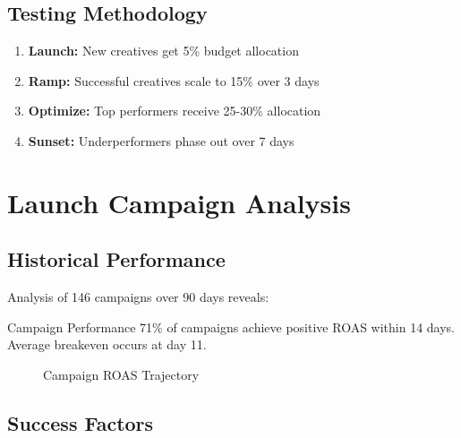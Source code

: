 \documentclass[11pt,a4paper]{report}
\begin{document}
\section{Testing Methodology}

\begin{enumerate}
\item \textbf{Launch:} New creatives get 5\% budget allocation
\item \textbf{Ramp:} Successful creatives scale to 15\% over 3 days
\item \textbf{Optimize:} Top performers receive 25-30\% allocation
\item \textbf{Sunset:} Underperformers phase out over 7 days
\end{enumerate}

\clearpage

\chapter{Launch Campaign Analysis}

\section{Historical Performance}

Analysis of 146 campaigns over 90 days reveals:

\begin{insightbox}{Campaign Performance}
71\% of campaigns achieve positive ROAS within 14 days. Average breakeven occurs at day 11.
\end{insightbox}

\begin{figure}[H]
\centering
{}
\caption{Campaign ROAS Trajectory}
\end{figure}

\section{Success Factors}
\end{document}
